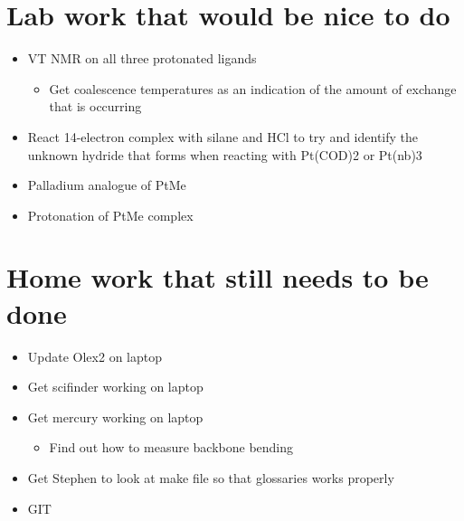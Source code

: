 \section{Lab work that would be nice to do}
\begin{itemize}
\item{VT NMR on all three protonated ligands}
	\begin{itemize}
	\item{Get coalescence temperatures as an indication of the amount of exchange that is occurring}
	\end{itemize}
\item{React 14-electron complex with silane and HCl to try and identify the unknown hydride that forms when reacting with Pt(COD)2 or Pt(nb)3}
\item{Palladium analogue of PtMe}
\item{Protonation of PtMe complex}
\end{itemize}

\newpage{}
\section{Home work that still needs to be done}
\begin{itemize}
\item{Update Olex2 on laptop}
\item{Get scifinder working on laptop}
\item{Get mercury working on laptop}
	\begin{itemize}
	\item{Find out how to measure backbone bending}
	\end{itemize}
\item{Get Stephen to look at make file so that glossaries works properly}
\item{GIT}
\end{itemize}

